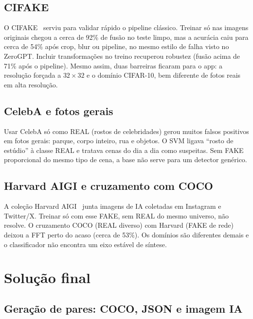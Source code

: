 \documentclass[12pt]{article}
\begin{document}
\subsection{CIFAKE}

O CIFAKE~\cite{bird2024cifake} serviu para validar rápido o pipeline clássico. Treinar só nas imagens originais chegou a cerca de 92\% de fusão no teste limpo, mas a acurácia caiu para cerca de 54\% após crop, blur ou pipeline, no mesmo estilo de falha visto no ZeroGPT. Incluir transformações no treino recuperou robustez (fusão acima de 71\% após o pipeline). Mesmo assim, duas barreiras ficaram para o app: a resolução forçada a $32{\times}32$ e o domínio CIFAR-10, bem diferente de fotos reais em alta resolução.

\subsection{CelebA e fotos gerais}

Usar CelebA só como REAL (rostos de celebridades) gerou muitos falsos positivos em fotos gerais: parque, corpo inteiro, rua e objetos. O SVM ligava ``rosto de estúdio'' à classe REAL e tratava cenas do dia a dia como suspeitas. Sem FAKE proporcional do mesmo tipo de cena, a base não serve para um detector genérico.

\subsection{Harvard AIGI e cruzamento com COCO}

A coleção Harvard AIGI~\cite{harvardAIGI} junta imagens de IA coletadas em Instagram e Twitter/X. Treinar só com esse FAKE, sem REAL do mesmo universo, não resolve. O cruzamento COCO (REAL diverso) com Harvard (FAKE de rede) deixou a FFT perto do acaso (cerca de 53\%). Os domínios são diferentes demais e o classificador não encontra um eixo estável de síntese.

\section{Solução final}
\label{sec:solucao}

\subsection{Geração de pares: COCO, JSON e imagem IA}
\end{document}
